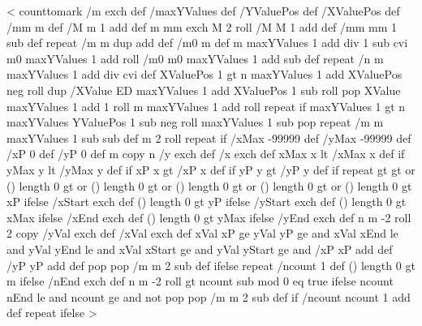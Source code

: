 <{%
  counttomark /m exch def
  /maxYValues \psk@plotNoMax\space def
  /YValuePos \psk@plotNo\space def
  /XValuePos \psk@plotNoX\space def
  \ifPsk@xyValues\else %
    /mm m def
    /M m 1 add def
    m { mm exch M 2 roll /M M 1 add def /mm mm 1 sub def } repeat
    /m m dup add def
  \fi
  \ifPst@ChangeOrder
    /m0 m def
    m maxYValues 1 add div 1 sub cvi {
      m0 maxYValues 1 add roll /m0 m0 maxYValues 1 add sub def
    } repeat
  \fi
  /n m maxYValues 1 add div cvi def
%
%
  XValuePos 1 gt {%
    n {
      maxYValues 1 add XValuePos neg roll    %
      dup /XValue ED
      maxYValues 1 add XValuePos 1 sub  roll %
      pop XValue                             %
      maxYValues 1 add 1 roll                %
      m maxYValues 1 add  roll               %
    } repeat
  } if %
  maxYValues 1 gt {%
    n {
      maxYValues YValuePos 1 sub neg roll %
      maxYValues 1 sub { pop } repeat     %
      /m m maxYValues 1 sub sub def
      m 2 roll
    } repeat
  } if %
  /xMax -99999 def /yMax -99999 def
  /xP 0 def /yP 0 def
  m copy
  n {
    /y exch def /x exch def
    xMax x lt { /xMax x def } if
    yMax y lt {/yMax y def } if
    xP x gt { /xP x def } if
    yP y gt { /yP y def } if
  } repeat
  \psk@xStep{} gt \psk@yStep{} gt or (\psk@xStart) length 0 gt or
  (\psk@yStart) length 0 gt or (\psk@xEnd) length 0 gt or (\psk@yEnd) length 0 gt or {
%
    (\psk@xStart) length 0 gt {\psk@xStart\space }{ xP } ifelse /xStart exch def
    (\psk@yStart) length 0 gt {\psk@yStart\space }{ yP } ifelse /yStart exch def
    (\psk@xEnd) length 0 gt { \psk@xEnd\space }{ xMax } ifelse /xEnd exch def
    (\psk@yEnd) length 0 gt { \psk@yEnd\space }{ yMax } ifelse /yEnd exch def
    n {
      m -2 roll
      2 copy /yVal exch def /xVal exch def
      xVal xP ge
      yVal yP ge and
      xVal xEnd le and
      yVal yEnd le and
      xVal xStart ge and
      yVal yStart ge and {
        /xP xP \psk@xStep\space add def
        /yP yP \psk@yStep\space add def
      }{%
        pop pop
        /m m 2 sub def
      } ifelse
    } repeat
  }{%
    /ncount 1 def
    (\psk@nEnd) length 0 gt { \psk@nEnd\space }{ m } ifelse 
    /nEnd exch def
    n {
      m -2 roll
      \psk@nStep{} gt { ncount \psk@nStart\space sub \psk@nStep\space mod 0 eq }{ true } ifelse
        ncount nEnd le and
        ncount \psk@nStart\space ge and not {
          pop pop
          /m m 2 sub def
        } if
        /ncount ncount 1 add def
      } repeat
  } ifelse
}>
